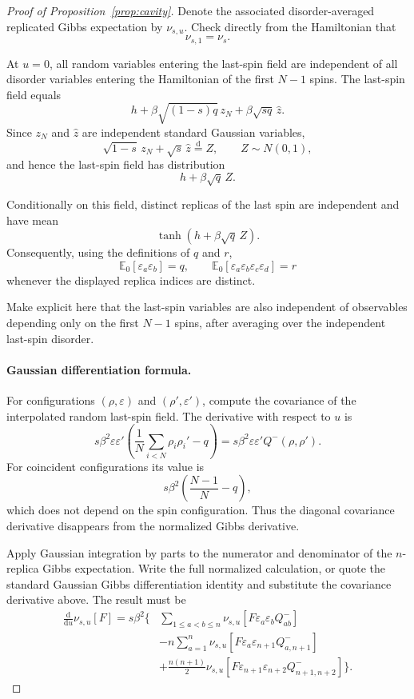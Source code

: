 \begin{proof}[Proof of Proposition~\ref{prop:cavity}]
Denote the associated disorder-averaged replicated Gibbs expectation by
$\nu_{s,u}$.  Check directly from the Hamiltonian that
\[
 \nu_{s,1}=\nu_s.
\]

At $u=0$, all random variables entering the last-spin field are independent
of all disorder variables entering the Hamiltonian of the first $N-1$ spins.
The last-spin field equals
\[
 h+\beta\sqrt{(1-s)q}\,z_N+\beta\sqrt{sq}\,\widehat z.
\]
Since $z_N$ and $\widehat z$ are independent standard Gaussian variables,
\[
 \sqrt{1-s}\,z_N+\sqrt{s}\,\widehat z
 \stackrel{\mathrm d}=Z,
 \qquad Z\sim N(0,1),
\]
and hence the last-spin field has distribution
\[
 h+\beta\sqrt q\,Z.
\]

Conditionally on this field, distinct replicas of the last spin are
independent and have mean
\[
 \tanh(h+\beta\sqrt q\,Z).
\]
Consequently, using the definitions of $q$ and $r$,
\begin{equation}
 \mathbb E_0[\varepsilon_a\varepsilon_b]=q,
 \qquad
 \mathbb E_0[
 \varepsilon_a\varepsilon_b\varepsilon_c\varepsilon_d
 ]=r
 \label{eq:last-spin-moments-proof}
\end{equation}
whenever the displayed replica indices are distinct.

Make explicit here that the last-spin variables are also independent of
observables depending only on the first $N-1$ spins, after averaging over the
independent last-spin disorder.

\paragraph{Gaussian differentiation formula.}

For configurations $(\rho,\varepsilon)$ and
$(\rho',\varepsilon')$, compute the covariance of the interpolated random
last-spin field.  The derivative with respect to $u$ is
\[
 s\beta^2\varepsilon\varepsilon'
 \left(
 \frac1N\sum_{i<N}\rho_i\rho_i'-q
 \right)
 =
 s\beta^2\varepsilon\varepsilon'Q^-(\rho,\rho').
\]
For coincident configurations its value is
\[
 s\beta^2
 \left(\frac{N-1}{N}-q\right),
\]
which does not depend on the spin configuration.  Thus the diagonal
covariance derivative disappears from the normalized Gibbs derivative.

Apply Gaussian integration by parts to the numerator and denominator of the
$n$-replica Gibbs expectation.  Write the full normalized calculation, or
quote the standard Gaussian Gibbs differentiation identity and substitute
the covariance derivative above.  The result must be
\begin{align}
 \frac{\mathrm d}{\mathrm du}\nu_{s,u}[F]
 =s\beta^2\Bigg\{&
 \sum_{1\le a<b\le n}
 \nu_{s,u}
 [F\varepsilon_a\varepsilon_bQ^-_{ab}]
 \nonumber\\
 &-n\sum_{a=1}^n
 \nu_{s,u}
 [F\varepsilon_a\varepsilon_{n+1}Q^-_{a,n+1}]
 \nonumber\\
 &+\frac{n(n+1)}2
 \nu_{s,u}
 [F\varepsilon_{n+1}\varepsilon_{n+2}
 Q^-_{n+1,n+2}]
 \Bigg\}.
 \label{eq:cavity-derivative-proof}
\end{align}


\end{proof}
